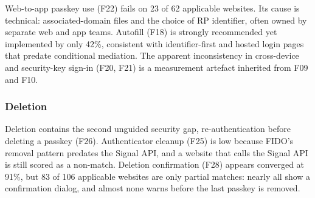 \documentclass[letterpaper,twocolumn,10pt]{article}
\begin{document}
Web-to-app passkey use (F22) fails on 23 of 62 applicable websites. Its cause is technical: associated-domain files and the choice of RP identifier, often owned by separate web and app teams. Autofill (F18) is strongly recommended yet implemented by only 42\%, consistent with identifier-first and hosted login pages that predate conditional mediation. The apparent inconsistency in cross-device and security-key sign-in (F20, F21) is a measurement artefact inherited from F09 and F10.

\subsubsection{Deletion}

Deletion contains the second unguided security gap, re-authentication before deleting a passkey (F26). Authenticator cleanup (F25) is low because FIDO's removal pattern predates the Signal API, and a website that calls the Signal API is still scored as a non-match. Deletion confirmation (F28) appears converged at 91\%, but 83 of 106 applicable websites are only partial matches: nearly all show a confirmation dialog, and almost none warns before the last passkey is removed.
\end{document}
